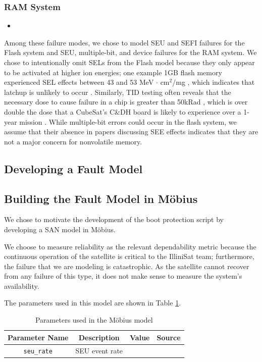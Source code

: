 \subsubsection{RAM System}\label{sec:rammodel}
\begin{itemize}
\item
\end{itemize}

Among these failure modes, we chose to model SEU and SEFI failures for the Flash system and SEU, multiple-bit, and device failures for the RAM system.  We chose to intentionally omit SELs from the Flash model because they only appear to be activated at higher ion energies; one example 1GB flash memory experienced SEL effects between 43 and 53 MeV $\cdot$ cm$^2$/mg \cite{Langley2004SEE}, which indicates that latchup is unlikely to occur \cite{Schwank2013Radiation}.  Similarly, TID testing often reveals that the necessary dose to cause failure in a chip is greater than 50kRad \cite{Oldman2008TID}, which is over double the dose that a CubeSat's C\&DH board is likely to experience over a 1-year mission \cite{Likar2010Novel}.  While multiple-bit errors could occur in the flash system, we assume that their absence in papers discussing SEE effects indicates that they are not a major concern for nonvolatile memory.

\subsection{Developing a Fault Model}\label{sec:developingmodel}



\subsection{Building the Fault Model in M\"obius}\label{sec:buildingmodel}

We chose to motivate the development of the boot protection script by developing a SAN model in M\"obius.

We choose to measure reliability as the relevant dependability metric because the continuous operation of the satellite is critical to the IlliniSat team; furthermore, the failure that we are modeling is catastrophic.  As the satellite cannot recover from any failure of this type, it does not make sense to measure the system's availability.

The parameters used in this model are shown in Table \ref{tab:parameters}.

\begin{table}[width = 0.5\textwidth]
\centering
\begin{tabular}{|c|c|c|c|}
\hline
{\bf Parameter Name} & {\bf Description} & {\bf Value} & {\bf Source}\\
\hline
\texttt{seu\_rate} & SEU event rate & & \\
\hline
\end{tabular}
\caption{Parameters used in the M\"obius model}
\label{tab:parameters}
\end{table}
